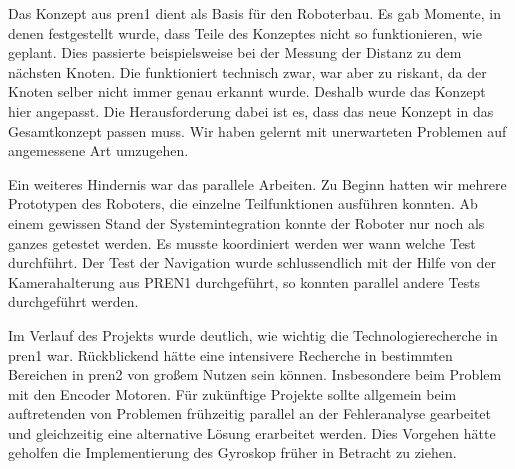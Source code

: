 Das Konzept aus \acrshort{pren1} dient als Basis für den Roboterbau. Es gab Momente, in denen festgestellt wurde, dass Teile des Konzeptes nicht so funktionieren, wie geplant. Dies passierte beispielsweise bei der Messung der Distanz zu dem nächsten Knoten. Die funktioniert technisch zwar, war aber zu riskant, da der Knoten selber nicht immer genau erkannt wurde. Deshalb wurde das Konzept hier angepasst. Die Herausforderung dabei ist es, dass das neue Konzept in das Gesamtkonzept passen muss. Wir haben gelernt mit unerwarteten Problemen auf angemessene Art umzugehen.

Ein weiteres Hindernis war das parallele Arbeiten. Zu Beginn hatten wir mehrere Prototypen des Roboters, die einzelne Teilfunktionen ausführen konnten. Ab einem gewissen Stand der Systemintegration konnte der Roboter nur noch als ganzes getestet werden. Es musste koordiniert werden wer wann welche Test durchführt. Der Test der Navigation wurde schlussendlich mit der Hilfe von der Kamerahalterung aus PREN1 durchgeführt, so konnten parallel andere Tests durchgeführt werden.

Im Verlauf des Projekts wurde deutlich, wie wichtig die Technologierecherche in \acrshort{pren1} war. Rückblickend hätte eine intensivere Recherche in bestimmten Bereichen in \acrshort{pren2} von großem Nutzen sein können. Insbesondere beim Problem mit den Encoder Motoren. Für zukünftige Projekte sollte allgemein beim auftretenden von Problemen frühzeitig parallel an der Fehleranalyse gearbeitet und gleichzeitig eine alternative Lösung erarbeitet werden. Dies Vorgehen hätte geholfen die Implementierung des Gyroskop früher in Betracht zu ziehen.

